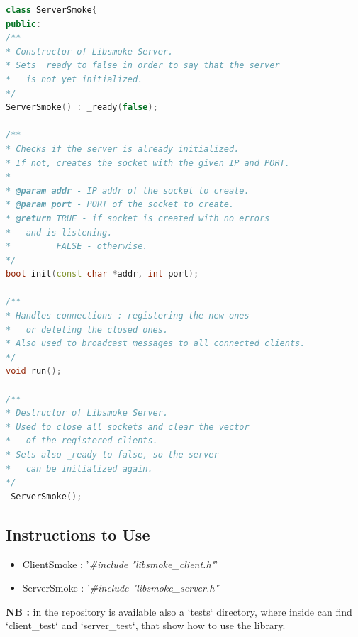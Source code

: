 \begin{lstlisting}[language=C++, caption={ServerSmoke}]
class ServerSmoke{
public:
/**
* Constructor of Libsmoke Server.
* Sets _ready to false in order to say that the server
*	is not yet initialized.
*/
ServerSmoke() : _ready(false);

/**
* Checks if the server is already initialized.
* If not, creates the socket with the given IP and PORT.
*
* @param addr - IP addr of the socket to create.
* @param port - PORT of the socket to create.
* @return TRUE - if socket is created with no errors
*	and is listening.
*         FALSE - otherwise.
*/
bool init(const char *addr, int port);

/**
* Handles connections : registering the new ones
*	or deleting the closed ones.
* Also used to broadcast messages to all connected clients.
*/
void run();

/**
* Destructor of Libsmoke Server.
* Used to close all sockets and clear the vector
*	of the registered clients.
* Sets also _ready to false, so the server
*	can be initialized again.
*/
-ServerSmoke();
\end{lstlisting}

\newpage
\subsection{Instructions to Use}
\vspace{0.5cm}
\begin{itemize}
	\setlength{\leftskip}{0.5cm}
	\item ClientSmoke : '\emph{\#include "libsmoke\_client.h"}'
	\item ServerSmoke : '\emph{\#include "libsmoke\_server.h"}'
\end{itemize}
\vspace{0.2cm}

\textbf{NB : }in the repository is available also a `tests` directory, where inside can find `client\_test` and `server\_test`, that show how to use the library.